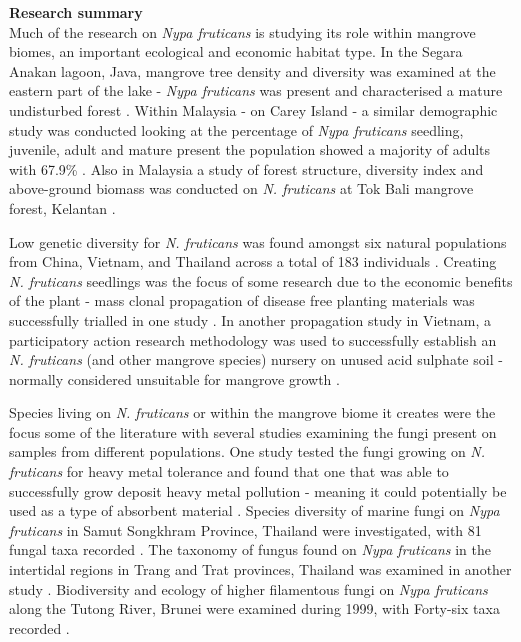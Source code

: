 \documentclass[openany]{book}
\theoremstyle{definition}
\theoremstyle{definition}
\theoremstyle{definition}
\theoremstyle{remark}
\begin{document}
\textbf{Research summary}\\
Much of the research on \emph{Nypa fruticans} is studying its role
within mangrove biomes, an important ecological and economic habitat
type. In the Segara Anakan lagoon, Java, mangrove tree density and
diversity was examined at the eastern part of the lake - \emph{Nypa
fruticans} was present and characterised a mature undisturbed forest
\citep{Hinrichs_2008}. Within Malaysia - on Carey Island - a similar
demographic study was conducted looking at the percentage of \emph{Nypa
fruticans} seedling, juvenile, adult and mature present the population
showed a majority of adults with 67.9\% \citep{Aslezaeim_2010}. Also in
Malaysia a study of forest structure, diversity index and above-ground
biomass was conducted on \emph{N. fruticans} at Tok Bali mangrove
forest, Kelantan \citep{Kamaruzaman_2007}.

Low genetic diversity for \emph{N. fruticans} was found amongst six
natural populations from China, Vietnam, and Thailand across a total of
183 individuals \citep{Jian_2010}. Creating \emph{N. fruticans}
seedlings was the focus of some research due to the economic benefits of
the plant - mass clonal propagation of disease free planting materials
was successfully trialled in one study \citep{Mantiquilla_2015}. In
another propagation study in Vietnam, a participatory action research
methodology was used to successfully establish an \emph{N. fruticans}
(and other mangrove species) nursery on unused acid sulphate soil -
normally considered unsuitable for mangrove growth \citep{Nguyen_2016a}.

Species living on \emph{N. fruticans} or within the mangrove biome it
creates were the focus some of the literature with several studies
examining the fungi present on samples from different populations. One
study tested the fungi growing on \emph{N. fruticans} for heavy metal
tolerance and found that one that was able to successfully grow deposit
heavy metal pollution - meaning it could potentially be used as a type
of absorbent material \citep{Choo_2015}. Species diversity of marine
fungi on \emph{Nypa fruticans} in Samut Songkhram Province, Thailand
were investigated, with 81 fungal taxa recorded
\citep{Pilantanapak_2005}. The taxonomy of fungus found on \emph{Nypa
fruticans} in the intertidal regions in Trang and Trat provinces,
Thailand was examined in another study \citep{Suetrong_2015}.
Biodiversity and ecology of higher filamentous fungi on \emph{Nypa
fruticans} along the Tutong River, Brunei were examined during 1999,
with Forty-six taxa recorded \citep{Hyde_2006}.
\end{document}
